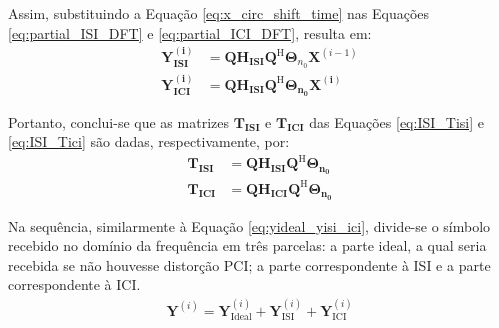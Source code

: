 Assim, substituindo a Equação \ref{eq:x_circ_shift_time} nas Equações \ref{eq:partial_ISI_DFT} e \ref{eq:partial_ICI_DFT}, resulta em:
\begin{align}
\mathbf{Y_\text{ISI}^{(i)}} &=  \mathbf{Q} \mathbf{ H_\text{ISI}} \mathbf{Q}^\text{H} \mathbf{\Theta}_{n_0} \mathbf{X}^{(i-1)}
\label{eq:partial_ISI_DFT2}\\
\mathbf{Y_\text{ICI}^{(i)}} &=  \mathbf{Q} \mathbf{ H_\text{ISI}} \mathbf{Q}^\text{H} \mathbf{\Theta_{n_0} \mathbf{X^{(i)}}}
\label{eq:partial_ICI_DFT2}
\end{align}

Portanto, conclui-se que as matrizes $\mathbf{ T_\text{ISI}}$ e $\mathbf{ T_\text{ICI}}$ das Equações \ref{eq:ISI_Tisi} e \ref{eq:ISI_Tici} são dadas, respectivamente, por:
\begin{align}
\mathbf{ T_\text{ISI}} &= \mathbf{Q} \mathbf{ H_\text{ISI}} \mathbf{Q}^\text{H} \mathbf{\Theta_{n_0}}\\
\mathbf{ T_\text{ICI}} &= \mathbf{Q} \mathbf{ H_\text{ICI}} \mathbf{Q}^\text{H} \mathbf{\Theta_{n_0}}
\label{eq:tici_definition}
\end{align}

Na sequência, similarmente à Equação \ref{eq:yideal_yisi_ici}, divide-se o símbolo recebido no domínio da frequência em três parcelas: a parte ideal, a qual seria recebida se não houvesse distorção PCI; a parte correspondente à ISI e a parte correspondente à ICI.
\begin{align}
\mathbf{Y}^{(i)}= \mathbf{Y}_\text{Ideal}^{(i)} + \mathbf{Y}_\text{ISI}^{(i)} + \mathbf{Y}_\text{ICI}^{(i)}
\label{eq:rx_symbol_freq_domain}
\end{align}

